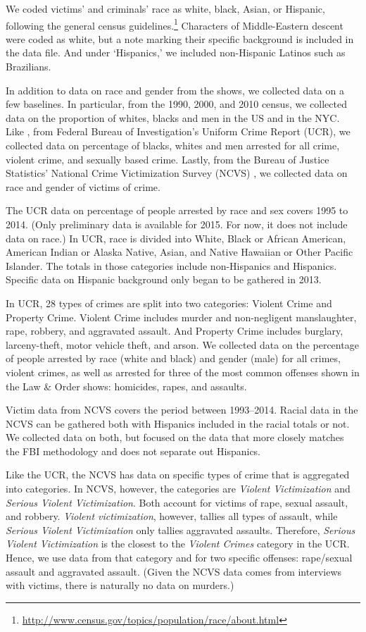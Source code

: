\documentclass[12pt, letterpaper]{article}
\begin{document}
We coded victims' and criminals' race as white, black, Asian, or Hispanic, following the general census guidelines.\footnote{\url{http://www.census.gov/topics/population/race/about.html}} Characters of Middle-Eastern descent were coded as white, but a note marking their specific background is included in the data file. And under `Hispanics,' we included non-Hispanic Latinos such as Brazilians.

In addition to data on race and gender from the shows, we collected data on a few baselines. In particular, from the 1990, 2000, and 2010 census, we collected data on the proportion of whites, blacks and men in the US and in the NYC. Like \citet{dixon2000overrepresentation}, from Federal Bureau of Investigation's Uniform Crime Report (UCR), we collected data on percentage of blacks, whites and men arrested for all crime, violent crime, and sexually based crime. Lastly, from the Bureau of Justice Statistics' National Crime Victimization Survey (NCVS) \citep{powers2016national, victimization1998national}, we collected data on race and gender of victims of crime.  

The UCR data on percentage of people arrested by race and sex covers 1995 to 2014. (Only preliminary data is available for 2015. For now, it does not include data on race.) In UCR, race is divided into White, Black or African American, American Indian or Alaska Native, Asian, and Native Hawaiian or Other Pacific Islander. The totals in those categories include non-Hispanics and Hispanics. Specific data on Hispanic background only began to be gathered in 2013. 

In UCR, 28 types of crimes are split into two categories: Violent Crime and Property Crime. Violent Crime includes murder and non-negligent manslaughter, rape, robbery, and aggravated assault. And Property Crime includes burglary, larceny-theft, motor vehicle theft, and arson. We collected data on the percentage of people arrested by race (white and black) and gender (male) for all crimes, violent crimes, as well as arrested for three of the most common offenses shown in the Law \& Order shows: homicides, rapes, and assaults.

Victim data from NCVS covers the period between 1993--2014. Racial data in the NCVS can be gathered both with Hispanics included in the racial totals or not. We collected data on both, but focused on the data that more closely matches the FBI methodology and does not separate out Hispanics.

Like the UCR, the NCVS has data on specific types of crime that is aggregated into categories. In NCVS, however, the categories are \textit{Violent Victimization} and \textit{Serious Violent Victimization}. Both account for victims of rape, sexual assault, and robbery. \textit{Violent victimization}, however, tallies all types of assault, while \textit{Serious Violent Victimization} only tallies aggravated assaults. Therefore, \textit{Serious Violent Victimization} is the closest to the \textit{Violent Crimes} category in the UCR. Hence, we use data from that category and for two specific offenses: rape/sexual assault and aggravated assault. (Given the NCVS data comes from interviews with victims, there is naturally no data on murders.)
\end{document}

